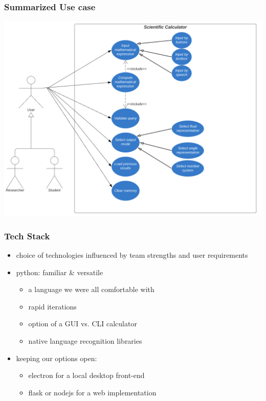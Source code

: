 \documentclass{beamer}
\begin{document}
\begin{frame}
\frametitle{Summarized Use case}
\includegraphics[scale=0.5]{Use Case}
\end{frame}

\begin{frame}
\frametitle{Tech Stack}
 \begin{itemize}
  \item choice of technologies influenced by team strengths and user requirements
  \item python: familiar \& versatile
   \begin{itemize}
    \item a language we were all comfortable with
    \item rapid iterations
    \item option of a GUI vs. CLI calculator
    \item native language recognition libraries
   \end{itemize}
  \item keeping our options open:
   \begin{itemize}
    \item electron for a local desktop front-end
    \item flask or nodejs for a web implementation
   \end{itemize}
  \end{itemize}
\end{frame}
\end{document}
